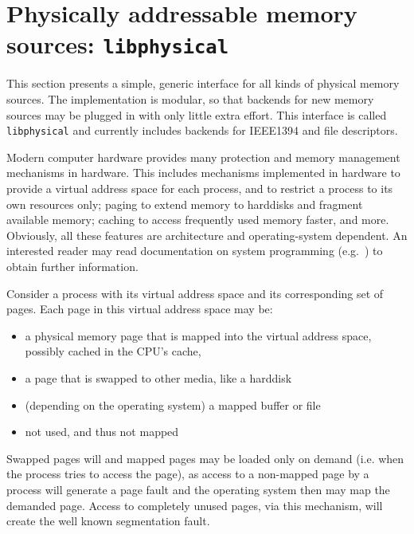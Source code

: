 %
%

\section{Physically addressable memory sources: \texttt{libphysical}}

\label{memsources}

This section presents a simple, generic interface for all kinds of physical
memory sources. The implementation is modular, so that backends for new memory
sources may be plugged in with only little extra effort. This interface is
called \texttt{libphysical} and currently includes backends for IEEE1394 and
file descriptors.

Modern computer hardware provides many protection and memory management
mechanisms in hardware. This includes mechanisms implemented in hardware to
provide a virtual address space for each process, and to restrict a process to
its own resources only; paging to extend memory to harddisks and fragment
available memory; caching to access frequently used memory faster, and more.
Obviously, all these features are architecture and operating-system dependent.
An interested reader may read documentation on system programming
(e.g.~\cite{IA32_SDM_3a:2006,IA32_SDM_3b:2006}) to obtain further information.

Consider a process with its virtual address space and its corresponding set of
pages.  Each page in this virtual address space may be:

\begin{itemize}

	\item a physical memory page that is mapped into the virtual address space,
	possibly cached in the CPU's cache,

	\item a page that is swapped to other media, like a harddisk

	\item (depending on the operating system) a mapped buffer or file

	\item not used, and thus not mapped

\end{itemize}

Swapped pages will and mapped pages may be loaded only on demand (i.e\@. when
the process tries to access the page), as access to a non-mapped page by a
process will generate a page fault and the operating system then may map the
demanded page.  Access to completely unused pages, via this mechanism, will
create the well known segmentation fault.

